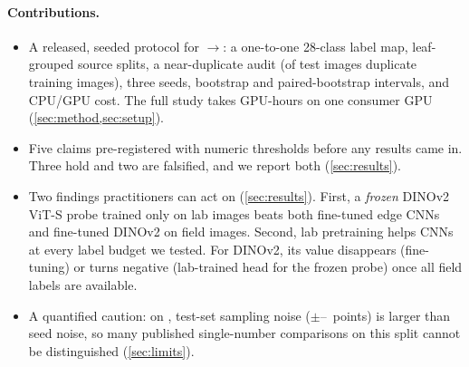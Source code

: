 \paragraph{Contributions.}
\begin{itemize}
\item A released, seeded protocol for \PV$\rightarrow$\PD: a one-to-one 28-class label map, leaf-grouped source splits, a near-duplicate audit (\PDdups of \PDtestN \PD test images duplicate training images), three seeds, bootstrap and paired-bootstrap intervals, and CPU/GPU cost. The full study takes \GPUHours GPU-hours on one consumer GPU (\cref{sec:method,sec:setup}).
\item Five claims pre-registered with numeric thresholds before any results came in. Three hold and two are falsified, and we report both (\cref{sec:results}).
\item Two findings practitioners can act on (\cref{sec:results}). First, a \emph{frozen} DINOv2 ViT-S probe trained only on lab images beats both fine-tuned edge CNNs and fine-tuned DINOv2 on field images. Second, lab pretraining helps CNNs at every label budget we tested. For DINOv2, its value disappears (fine-tuning) or turns negative (lab-trained head for the frozen probe) once all field labels are available.
\item A quantified caution: on \PD, test-set sampling noise ($\pm$\CIhwMin--\CIhwMax\ points) is larger than seed noise, so many published single-number comparisons on this split cannot be distinguished (\cref{sec:limits}).
\end{itemize}
